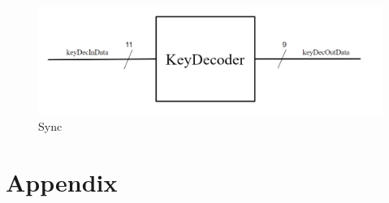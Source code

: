 \documentclass[a4paper]{article}
\begin{document}
\begin{figure}[h]
    \includegraphics[width=6 in]{./Images/DiagramsYang/keyDec.png}
    \caption{Sync}
    \label{fig:17}
\end{figure}


\section{Appendix}



\end{document}

